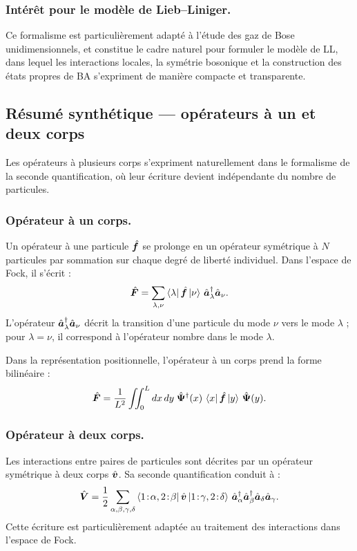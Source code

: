 \subsubsection{Intérêt pour le modèle de Lieb--Liniger.}
Ce formalisme est particulièrement adapté à l’étude des gaz de Bose unidimensionnels, et constitue le cadre naturel pour formuler le modèle de \gls{LL}, dans lequel les interactions locales, la symétrie bosonique et la construction des états propres de \gls{BA} s’expriment de manière compacte et transparente.

\subsection{Résumé synthétique — opérateurs à un et deux corps}

Les opérateurs à plusieurs corps s’expriment naturellement dans le formalisme de la seconde quantification, où leur écriture devient indépendante du nombre de particules.

\subsubsection{Opérateur à un corps.}

Un opérateur à une particule $\hat{\bm{f}}$ se prolonge en un opérateur symétrique à $N$ particules par sommation sur chaque degré de liberté individuel. Dans l’espace de Fock, il s’écrit :
\begin{equation}
	\hat{\bm{F}}
	=
	\sum_{\lambda,\nu}
	\bra{\lambda}\hat{\bm{f}}\ket{\nu}\,
	\hat{\bm{a}}^\dagger_\lambda \hat{\bm{a}}_\nu .
\end{equation}
L’opérateur $\hat{\bm{a}}^\dagger_\lambda \hat{\bm{a}}_\nu$ décrit la transition d’une particule du mode $\nu$ vers le mode $\lambda$ ; pour $\lambda=\nu$, il correspond à l’opérateur nombre dans le mode $\lambda$.

Dans la représentation positionnelle, l’opérateur à un corps prend la forme bilinéaire :
\begin{equation}
	\hat{\bm{F}}
	=
    \frac{1}{L^2}
	\iint_0^L dx\,dy\;
	\hat{\bm{\Psi}}^\dagger(x)\,
	\bra{x}\hat{\bm{f}}\ket{y}\,
	\hat{\bm{\Psi}}(y).
\end{equation}

\subsubsection{Opérateur à deux corps.}

Les interactions entre paires de particules sont décrites par un opérateur symétrique à deux corps $\hat{\bm{v}}$. Sa seconde quantification conduit à :
\begin{equation}
	\operator{V}
	=
	\frac{1}{2}
	\sum_{\alpha,\beta,\gamma,\delta}
	\bra{1\!:\!\alpha,2\!:\!\beta}\operator{v}\ket{1\!:\!\gamma,2\!:\!\delta}\,
	\operator{a}^\dagger_\alpha
	\operator{a}^\dagger_\beta
	\operator{a}_\delta
	\operator{a}_\gamma .
\end{equation}
Cette écriture est particulièrement adaptée au traitement des interactions dans l’espace de Fock.

